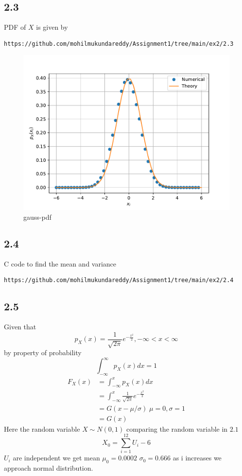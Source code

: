 \documentclass[journal,12pt,twocolumn]{IEEEtran}
\begin{document}
\subsection*{2.3}
PDF of $X$ is given by
\begin{lstlisting}
https://github.com/mohilmukundareddy/Assignment1/tree/main/ex2/2.3
\end{lstlisting}
\begin{figure}[H]
    \centering
    \includegraphics[scale =0.5]{gauss_pdf.pdf}
    \caption{gauss-pdf}
    \label{fig:my_label2}
\end{figure}


\subsection*{2.4}
C code to find the mean and variance
\begin{lstlisting}
https://github.com/mohilmukundareddy/Assignment1/tree/main/ex2/2.4
\end{lstlisting}

\subsection*{2.5}
Given that
$$p_X (x) = \frac{1}{\sqrt{2\pi}}e^{-\frac{x^2}{2}} ,-\infty <x< \infty$$
by property of probability $$\int_{-\infty} ^{\infty} p_X (x)dx = 1$$
\begin{align*}
    F_X (x) &= \int_{-\infty} ^{x} p_X (x) dx\\
     &=  \int_{-\infty} ^{x} \frac{1}{\sqrt{2\pi}}e^{-\frac{x^2}{2}} \\
     &= G(x-\mu/\sigma) \; \mu = 0, \sigma = 1 \\
     &= G(x)
\end{align*}
Here the random variable $X\sim N(0,1)$
comparing the random variable in $2.1$ \\
$$X_0 = \sum_{i=1} ^{12} U_i -6$$
$U_i$ are independent we get mean $\mu _{0} = 0.0002$
$\sigma _{0} = 0.666$ as i increases we approach 
normal distribution.
\end{document}
